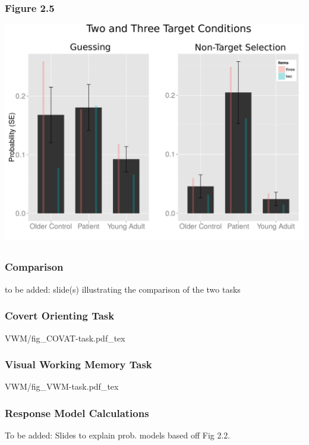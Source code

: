 \documentclass{beamer}
\begin{document}

\subsection*{}
\begin{frame}
	\frametitle{Comparison}
	to be added: slide(s) illustrating the comparison of the two tasks
\end{frame}


 \begin{frame}
	 \frametitle{Covert Orienting Task}
  \def\svgwidth{\textwidth}
  {VWM/fig_COVAT-task.pdf_tex}
 \end{frame}

  \begin{frame}
	 \frametitle{Visual Working Memory Task}
  \def\svgwidth{\textwidth}
  {VWM/fig_VWM-task.pdf_tex}
 \end{frame}

 \begin{frame}
	 \frametitle{Response Model Calculations}
 To be added: Slides to explain prob. models based off Fig 2.2.
 \end{frame}
\end{document}
